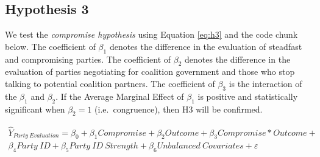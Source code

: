 \documentclass[]{article}
\begin{document}
\hypertarget{hypothesis-3}{%
\subsection{Hypothesis 3}\label{hypothesis-3}}

We test the \emph{compromise hypothesis} using Equation \ref{eq:h3} and
the code chunk below. The coefficient of \(\beta_{1}\) denotes the
difference in the evaluation of steadfast and compromising parties. The
coefficient of \(\beta_{2}\) denotes the difference in the evaluation of
parties negotiating for coalition government and those who stop talking
to potential coalition partners. The coefficient of \(\beta_{3}\) is the
interaction of the \(\beta_{1}\) and \(\beta_{2}\). If the Average
Marginal Effect of \(\beta_{1}\) is positive and statistically
significant when \(\beta_{2} = 1\) (i.e.~congruence), then H3 will be
confirmed.

\begin{equation}\label{eq:h3}
  \begin{aligned}
    \hat{Y}_{Party \ Evaluation} = \beta_{0} + \beta_{1}Compromise  + 
    \beta_{2}Outcome + \beta_{3}Compromise * Outcome + \nonumber \\
    \beta_{4}Party\ ID + \beta_{5}Party \ ID \ Strength + 
    \beta_{6}Unbalanced \ Covariates + \varepsilon
  \end{aligned}
\end{equation}
\end{document}
